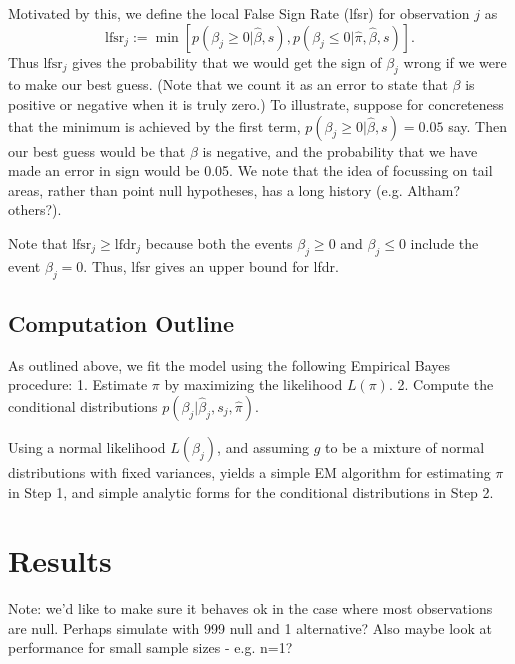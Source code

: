 \documentclass[11pt]{article}
\def\lfsr{\text{lfsr}}
\begin{document}
Motivated by this, we define the local False Sign Rate (lfsr) for observation $j$ as 
\begin{equation}
\lfsr_j := \min[ p(\beta_j \geq 0| \hat\beta, s), p(\beta_j \leq 0| \hat\pi, \hat\beta, s) ].
\end{equation}
Thus $\lfsr_j$ gives the probability that we would get the sign of $\beta_j$ wrong if we
were to make our best guess. (Note that we count it as an error to state that $\beta$ is positive or negative when it is truly zero.)
To illustrate, suppose for concreteness
that the minimum is achieved by the first term, $p(\beta_j \geq 0| \hat\beta, s)=0.05$ say. Then
our best guess would be that $\beta$ is negative, and the probability that we have
made an error in sign would be 0.05. We note that the idea of focussing on tail areas, rather than point null hypotheses,
has a long history (e.g. Altham? others?).

Note that $\text{lfsr}_j \geq \text{lfdr}_j$ 
because both the events $\beta_j \geq 0$
and $\beta_j \leq 0$ include the event $\beta_j=0$.
Thus, lfsr gives an upper bound for lfdr.






\subsection{Computation Outline}

As outlined above, we fit the model using the following Empirical Bayes procedure:
1. Estimate $\pi$ by maximizing the likelihood $L(\pi)$.
2. Compute the conditional distributions $p(\beta_j | \hat\beta_j, s_j, \hat\pi)$.

Using a normal likelihood $L(\beta_j)$, and assuming
$g$ to be a mixture of normal distributions with fixed variances, 
yields a simple EM algorithm
for estimating $\pi$ in Step 1, and simple analytic forms for the conditional
distributions in Step 2.


\section*{Results}

Note: we'd like to make sure it behaves ok in the case where most observations are null.
Perhaps simulate with 999 null and 1 alternative?
Also maybe look at performance for small sample sizes - e.g. n=1?
\end{document}
